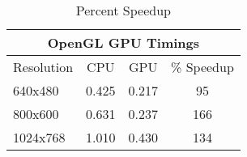 \begin{table}
\label{table:percentage}
\begin{tabular}{|l|c|c|c|}
\hline
\multicolumn{4}{|c|}{OpenGL GPU Timings} \\ \hline
Resolution & CPU & GPU & \% Speedup \\ \hline\hline
640x480 & 0.425 & 0.217 & 95\\ \hline
800x600 & 0.631 & 0.237 & 166 \\ \hline
1024x768 & 1.010 & 0.430 & 134 \\ \hline
\end{tabular}
\caption{Percent Speedup}
\end{table}